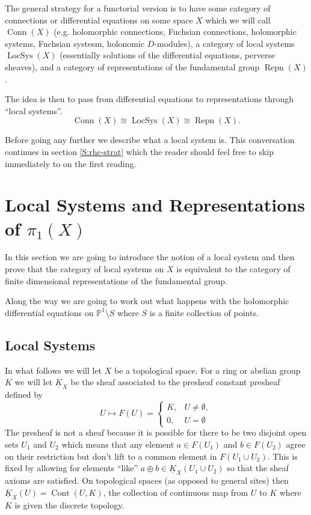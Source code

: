 \documentclass[12pt]{book}
\numberwithin{equation}{section}
\theoremstyle{definition}
\theoremstyle{remark}
\newcommand{\PP}{\mathbb{P}}
\newcommand{\LocSys}{\operatorname{LocSys}}
\newcommand{\Conn}{\operatorname{Conn}}
\newcommand{\Repn}{\operatorname{Repn}}
\begin{document}
The general strategy for a functorial version is to have some category of connections or differential equations on some space $X$ which we will call $\Conn(X)$ (e.g. holomorphic connections, Fuchsian connections, holomorphic systems, Fuchsian systesm, holonomic $D$-modules), a category of local systems $\LocSys(X)$ (essentially solutions of the differential equations, perverse sheaves), and a category of representations of the fundamental group $\Repn(X)$. 

The idea is then to pass from differential equations to representations through ``local systems''.
\begin{equation}
\Conn(X) \cong \LocSys(X) \cong \Repn(X) .
\end{equation}

Before going any further we describe what a local system is. 
This conversation continues in section \ref{S:rhc-strat} which the reader should feel free to skip immediately to on the first reading. 


\section{Local Systems and Representations of $\pi_1(X)$}
In this section we are going to introduce the notion of a local system and then prove that the category of local systems on $X$ is equivalent to the category of finite dimensional representations of the fundamental group. 

Along the way we are going to work out what happens with the holomorphic differential equations on $\PP^1\setminus S$ where $S$ is a finite collection of points. 

\subsection{Local Systems}
In what follows we will let $X$ be a topological space. 
For a ring or abelian group $K$ we will let $\underline{K}_X$ be the sheaf associated to the presheaf  constant presheaf defined by 
$$ U\mapsto F(U) = \begin{cases}
K, & U\neq \emptyset ,\\
0, & U = \emptyset 
\end{cases}$$
The presheaf is not a sheaf because it is possible for there to be two disjoint open sets $U_1$ and $U_2$ which means that any element $a \in F(U_1)$ and $b\in F(U_2)$ agree on their restriction but don't lift to a common element in $F(U_1 \cup U_2)$.
This is fixed by allowing for elements ``like'' $a\oplus b \in \underline{K}_X(U_1 \cup U_2)$  so that the sheaf axioms are satisfied. 
On topological spaces (as opposed to general sites) then $\underline{K}_X(U) = \operatorname{Cont}(U, K)$, the collection of continuous map from $U$ to $K$ where $K$ is given the discrete topology.
\end{document}
